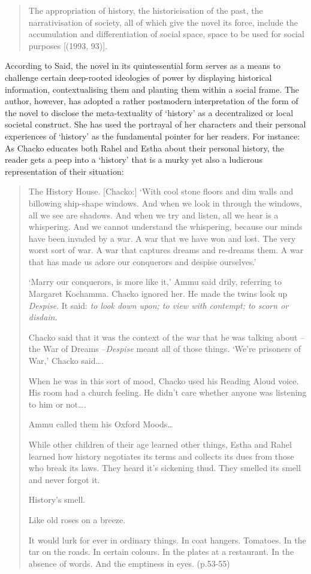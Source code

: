 \begin{quote}
  The appropriation of history, the historicisation of the past, the narrativisation of society, all of which give the novel its force, include the accumulation and differentiation of social space, space to be used for social purposes [(1993, 93)]. 
\end{quote}

According to Said, the novel in its quintessential form serves as a means to challenge certain deep-rooted ideologies of power by displaying historical information, contextualising them and planting them within a social frame. The author, however, has adopted a rather postmodern interpretation of the form of the novel to disclose the meta-textuality of ‘history’ as a decentralized or local societal construct. She has used the portrayal of her characters and their personal experiences of ‘history’ as the fundamental pointer for her readers. For instance: As Chacko educates both Rahel and Estha about their personal history, the reader gets a peep into a ‘history’ that is a murky yet also a ludicrous representation of their situation: 

\begin{quote}
  The History House. [Chacko:] ‘With cool stone floors and dim walls and 	billowing ship-shape windows. And when we look in through the windows, all we 	see are shadows. And when we try and listen, all we hear is a whispering. And we cannot understand the whispering, because our minds have been invaded by a war. 	A war that we have won and lost. The very worst sort of war. A war that captures 	dreams and re-dreams them. A war that has made us adore our conquerors and despise ourselves.’ 

  ‘Marry our conquerors, is more like it,’ Ammu said drily, referring to Margaret Kochamma. Chacko ignored her. He made the twins look up \emph{Despise}. It said: \emph{to look down upon; to view with contempt; to scorn or disdain}. 

  Chacko said that it was the context of the war that he was talking about – the War 	of Dreams –\emph{Despise} meant all of those things. ‘We’re prisoners of War,’ Chacko said….

  When he was in this sort of mood, Chacko used his Reading Aloud voice. His 	room had a church feeling. He didn’t care whether anyone was listening to him or not…. 

  Ammu called them his Oxford Moods… 

  While other children of their age learned other things, Estha and Rahel learned 	how history negotiates its terms and collects its dues from those who break its laws. They heard it’s sickening thud. They smelled its smell and never forgot it. 

  History’s smell.

  Like old roses on a breeze.

  It would lurk for ever in ordinary things. In coat hangers. Tomatoes. In the tar on the roads. In certain colours. In the plates at a restaurant. In the absence of words. And the emptiness in eyes. (p.53-55)
\end{quote}

